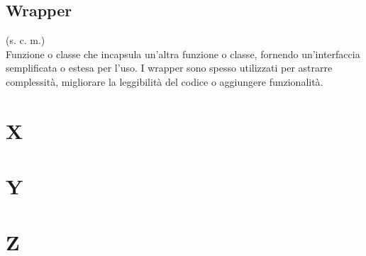 \subsection{Wrapper}
(s. c. m.)\\
Funzione o classe che incapsula un'altra funzione o classe, fornendo un'interfaccia
semplificata o estesa per l'uso. I wrapper sono spesso utilizzati per
astrarre complessità, migliorare la leggibilità del codice o aggiungere funzionalità.
\pagebreak
\section{X}
\pagebreak
\section{Y}
\pagebreak
\section{Z}
